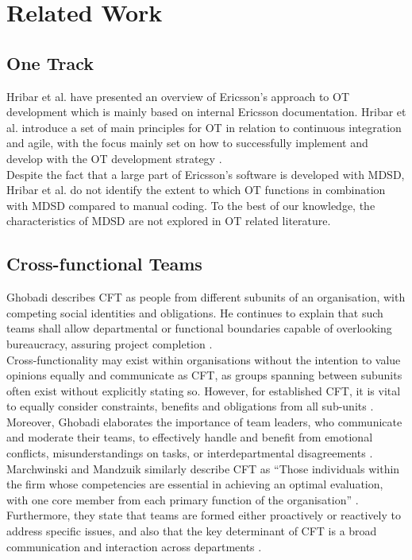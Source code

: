 \documentclass[fina_report_innit.tex]{subfiles}
\begin{document}
\section{Related Work}


\subsection{One Track}
Hribar et al. \cite{hribar2008first} have presented an overview of Ericsson's approach to OT development which is mainly based on internal Ericsson documentation. Hribar et al. introduce a set of main principles for OT in relation to continuous integration and agile, with the focus mainly set on how to successfully implement and develop with the OT development strategy \cite{hribar2008first}.
\\

Despite the fact that a large part of Ericsson's software is developed with MDSD, Hribar et al. do not identify the extent to which OT functions in combination with MDSD compared to manual coding. To the best of our knowledge, the characteristics of MDSD are not explored in OT related literature.

\subsection{Cross-functional Teams}
Ghobadi describes CFT as people from different subunits of an organisation, with competing social identities and obligations. He continues to explain that such teams shall allow departmental or functional boundaries capable of overlooking bureaucracy, assuring project completion \cite{ghobadi2011challenges}.
\\

Cross-functionality may exist within organisations without the intention to value opinions equally and communicate as CFT, as groups spanning between subunits often exist without explicitly stating so. However, for established CFT, it is vital to equally consider constraints, benefits and obligations from all sub-units \cite{ghobadi2011challenges}.
\\

Moreover, Ghobadi elaborates the importance of team leaders, who communicate and moderate their teams, to effectively handle and benefit from emotional conflicts, misunderstandings on tasks, or interdepartmental disagreements \cite{ghobadi2011challenges}.
\\

Marchwinski and Mandzuik similarly describe CFT as ``Those individuals within the firm whose competencies are essential in achieving an optimal evaluation, with one core member from each primary function of the organisation'' \cite{marchwinski2000technical}. Furthermore, they state that teams are formed either proactively or reactively to address specific issues, and also that the key determinant of CFT is a broad communication and interaction across departments \cite{marchwinski2000technical}.
\end{document}
